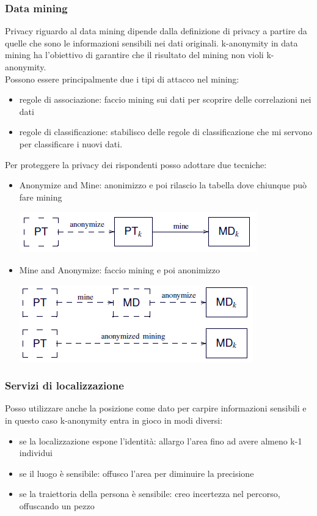 \subsubsection{Data mining}
Privacy riguardo al data mining dipende dalla definizione di privacy a partire da quelle che sono le informazioni sensibili nei dati originali. k-anonymity in data mining ha l'obiettivo di garantire che il risultato del mining non violi k-anonymity.\\
Possono essere principalmente due i tipi di attacco nel mining:
\begin{itemize}
    \item regole di associazione: faccio mining sui dati per scoprire delle correlazioni nei dati
    \item regole di classificazione: stabilisco delle regole di classificazione che mi servono per classificare i nuovi dati.
\end{itemize}
Per proteggere la privacy dei rispondenti posso adottare due tecniche:
\begin{itemize}
    \item Anonymize and Mine: anonimizzo e poi rilascio la tabella dove chiunque può fare mining
    \begin{center}
    \includegraphics[scale=0.6]{img/a&m.png}
\end{center}
    \item Mine and Anonymize: faccio mining e poi anonimizzo
    \begin{center}
    \includegraphics[scale=0.6]{img/m&a.png}
\end{center}
\end{itemize}
\subsubsection{Servizi di localizzazione}
Posso utilizzare anche la posizione come dato per carpire informazioni sensibili e in questo caso k-anonymity entra in gioco in modi diversi:
\begin{itemize}
    \item se la localizzazione espone l'identità: allargo l'area fino ad avere almeno k-1 individui
    \item se il luogo è sensibile: offusco l'area per diminuire la precisione
    \item se la traiettoria della persona è sensibile: creo incertezza nel percorso, offuscando un pezzo
\end{itemize}

